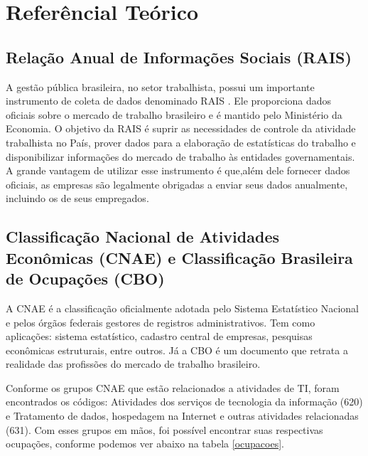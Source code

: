 \section{Referêncial Teórico}
\subsection{Relação Anual de Informações Sociais (RAIS)}

A gestão pública brasileira, no setor trabalhista, possui um importante instrumento de coleta de dados denominado RAIS \cite{Sobre_a_RAIS}. Ele proporciona dados oficiais sobre o mercado de trabalho brasileiro e é mantido pelo Ministério da Economia. O objetivo da RAIS é suprir as necessidades de controle da atividade trabalhista no País, prover dados para a elaboração de estatísticas do trabalho e disponibilizar informações do mercado de trabalho às entidades governamentais. A grande vantagem de utilizar esse instrumento é que,além dele fornecer dados oficiais, as empresas são legalmente obrigadas a enviar seus dados anualmente, incluindo os de seus empregados.

\subsection{Classificação Nacional de Atividades Econômicas (CNAE) e Classificação Brasileira de Ocupações (CBO)}

A CNAE \cite{Sobre_a_CNAE} é a classificação oficialmente adotada pelo Sistema Estatístico Nacional e pelos órgãos federais gestores de registros administrativos. Tem como aplicações: sistema estatístico, cadastro central de empresas, pesquisas econômicas estruturais, entre outros. Já a CBO \cite{Sobre_a_CBO} é um documento que retrata a realidade das profissões do mercado de trabalho brasileiro. 

Conforme os grupos CNAE que estão relacionados a atividades de TI, foram encontrados os códigos: Atividades dos serviços de tecnologia da informação (620) e Tratamento de dados, hospedagem na Internet e outras atividades relacionadas (631). Com esses grupos em mãos, foi possível encontrar suas respectivas ocupações, conforme podemos ver abaixo na tabela \ref{ocupacoes}.

